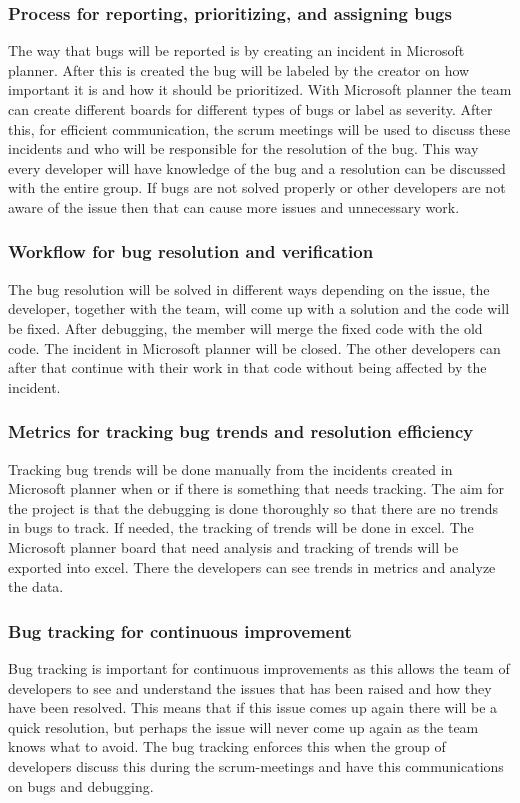 \documentclass{article}
\begin{document}
\subsubsection{Process for reporting, prioritizing, and assigning bugs}
The way that bugs will be reported is by creating an incident in Microsoft planner. After this is created the bug will be labeled by the creator on how important it is and how it should be prioritized. With Microsoft planner the team can create different boards for different types of bugs or label as severity. After this, for efficient communication, the scrum meetings will be used to discuss these incidents and who will be responsible for the resolution of the bug. This way every developer will have knowledge of the bug and a resolution can be discussed with the entire group. If bugs are not solved properly or other developers are not aware of the issue then that can cause more issues and unnecessary work.


\subsubsection{Workflow for bug resolution and verification}
The bug resolution will be solved in different ways depending on the issue, the developer, together with the team, will come up with a solution and the code will be fixed. After debugging, the member will merge the fixed code with the old code. The incident in Microsoft planner will be closed. The other developers can after that continue with their work in that code without being affected by the incident. 


\subsubsection{Metrics for tracking bug trends and resolution efficiency}
Tracking bug trends will be done manually from the incidents created in Microsoft planner when or if there is something that needs tracking. The aim for the project is that the debugging is done thoroughly so that there are no trends in bugs to track. If needed,  the tracking of trends will be done in excel. The Microsoft planner board that need analysis and tracking of trends will be exported into excel. There the developers can see trends in metrics and analyze the data. 


\subsubsection{Bug tracking for continuous improvement}
Bug tracking is important for continuous improvements as this allows the team of developers to see and understand the issues that has been raised and how they have been resolved. This means that if this issue comes up again there will be a quick resolution, but perhaps the issue will never come up again as the team knows what to avoid. The bug tracking enforces this when the group of developers discuss this during the scrum-meetings and have this communications on bugs and debugging.
\end{document}
